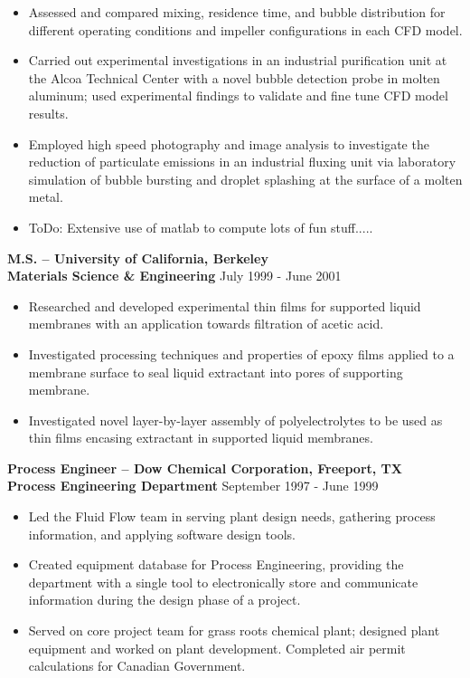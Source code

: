 \documentclass[11pt]{res} %
\begin{document}
\begin{resume}
\begin{itemize}
	\item Assessed and compared mixing, residence time, and bubble distribution for different operating conditions and impeller configurations in each CFD model.
	\item Carried out experimental investigations in an industrial purification unit at the Alcoa Technical Center with a novel bubble detection probe in molten aluminum; used experimental findings to validate and fine tune CFD model results.
	\item Employed high speed photography and image analysis to investigate the reduction of particulate emissions in an industrial fluxing unit via laboratory simulation of bubble bursting and droplet splashing at the surface of a molten metal.
	\item ToDo: Extensive use of matlab to compute lots of fun stuff.....
\end{itemize}
%
{\bf M.S. -- University of California, Berkeley} \\
{\bf Materials Science \& Engineering}
July 1999 - June 2001
\begin{itemize} \itemsep -1pt 
	\item Researched and developed experimental thin films for supported liquid membranes with an
application towards filtration of acetic acid.
	\item Investigated processing techniques and properties of epoxy films applied to a membrane
surface to seal liquid extractant into pores of supporting membrane.
	\item Investigated novel layer-by-layer assembly of polyelectrolytes to be used as thin films
encasing extractant in supported liquid membranes.
\end{itemize}
%
\vspace{4pt}
{\bf Process Engineer -- Dow Chemical Corporation, Freeport, TX} \\
{\bf Process Engineering Department}
September 1997 - June 1999
\begin{itemize} \itemsep -1pt 
	\item Led the Fluid Flow team in serving plant design needs, gathering process information, and applying software design tools.
	\item Created equipment database for Process Engineering, providing the department with a single tool to electronically store and communicate information during the design phase of a project.
	\item Served on core project team for grass roots chemical plant; designed plant equipment and worked on plant development. Completed air permit calculations for Canadian Government.
\end{itemize}
%

\end{resume}
\end{document}
